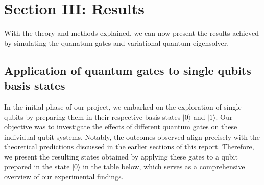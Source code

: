\documentclass[onecolumn,10pt,cleanfoot]{asme2ej}
\begin{document}
\section{Section III: Results}

With the theory and methods explained, we can now present the results achieved by simulating the quanatum gates and variational quantum eigensolver.

\subsection{Application of quantum gates to single qubits basis states}
In the initial phase of our project, we embarked on the exploration of single qubits by preparing them in their respective basis states $|0\rangle$ and $|1\rangle$. Our objective was to investigate the effects of different quantum gates on these individual qubit systems. Notably, the outcomes observed align precisely with the theoretical predictions discussed in the earlier sections of this report. Therefore, we present the resulting states obtained by applying these gates to a qubit prepared in the state $|0\rangle$ in the table below, which serves as a comprehensive overview of our experimental findings.
\end{document}
